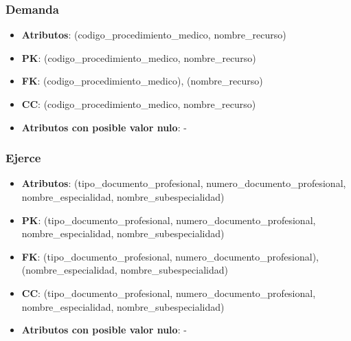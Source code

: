 \documentclass[a4paper,11pt]{article}
\begin{document}
\subsubsection{\textbf{Demanda}}

\begin{itemize}

\item 
\textbf{Atributos}: (codigo\_procedimiento\_medico, nombre\_recurso)

\item 
\textbf{PK}: (codigo\_procedimiento\_medico, nombre\_recurso)

\item
\textbf{FK}: (codigo\_procedimiento\_medico), (nombre\_recurso) 

\item 
\textbf{CC}: (codigo\_procedimiento\_medico, nombre\_recurso)

\item 
\textbf{Atributos con posible valor nulo}: -

\end{itemize}


\subsubsection{\textbf{Ejerce}}

\begin{itemize}

\item 
\textbf{Atributos}: (tipo\_documento\_profesional, numero\_documento\_profesional, nombre\_especialidad,
nombre\_subespecialidad)

\item 
\textbf{PK}: (tipo\_documento\_profesional, numero\_documento\_profesional, nombre\_especialidad,
nombre\_subespecialidad)

\item
\textbf{FK}: (tipo\_documento\_profesional, numero\_documento\_profesional), (nombre\_especialidad,
nombre\_subespecialidad)

\item 
\textbf{CC}: (tipo\_documento\_profesional, numero\_documento\_profesional, nombre\_especialidad,
nombre\_subespecialidad)

\item 
\textbf{Atributos con posible valor nulo}: -

\end{itemize}
\end{document}
